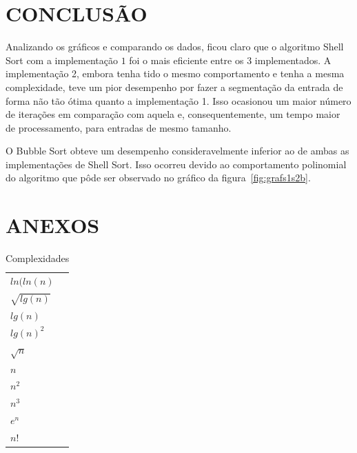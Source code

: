 \documentclass[titlepage,12pt,a4paper]{article}
\begin{document}
  \section{CONCLUSÃO}

    Analizando os gráficos e comparando os dados, ficou claro que o algoritmo
    Shell Sort com a implementação $1$ foi o mais eficiente entre os $3$
    implementados. A implementação 2, embora tenha tido o mesmo comportamento e
    tenha a mesma complexidade, teve um pior desempenho por fazer a segmentação
    da entrada de forma não tão ótima quanto a implementação 1. Isso ocasionou
    um maior número de iterações em comparação com aquela e, consequentemente,
    um tempo maior de processamento, para entradas de mesmo tamanho.

    O Bubble Sort obteve um desempenho consideravelmente inferior ao de ambas
    as implementações de Shell Sort. Isso ocorreu devido ao comportamento polinomial
    do algoritmo que pôde ser observado no gráfico da figura~\ref{fig:grafs1s2b}.

  \section{ANEXOS}
    \label{sec:anexos}

    \begin{table}[h]
      \caption{Complexidades \label{tab:complex}}
      \begin{center}
        \begin{tabular}{ l }
          $ln(ln(n)$ \\
          $\sqrt{lg(n)}$ \\
          $lg(n)$ \\
          $lg(n)^2$ \\
          $\sqrt{n}$ \\
          $n$ \\
          $n^2$ \\
          $n^3$ \\
          $e^n$ \\
          $n!$
        \end{tabular}
      \end{center}
    \end{table}
\end{document}
